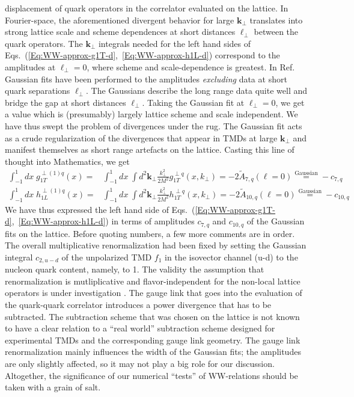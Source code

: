 \documentclass[a4paper,11pt]{article}
\newcommand{\ba}{\begin{eqnarray}}
\newcommand{\ea}{\end{eqnarray}}
\def\bflperp{{\bm \ell}_\perp}
\def\bfkperp{{\bm k}_\perp}
\def\kperp{k_\perp}
\begin{document}
displacement of quark operators in the correlator evaluated on the lattice. 
In Fourier-space, the aforementioned divergent behavior for large $\bfkperp$ 
translates into strong lattice scale and scheme dependences at short distances
$\bflperp$ between the quark operators. The $\bfkperp$ integrals needed for 
the left hand sides of Eqs.~(\ref{Eq:WW-approx-g1T-d},~\ref{Eq:WW-approx-h1L-d})
correspond to the amplitudes at $\bflperp = 0$, where scheme and 
scale-dependence is greatest.  In Ref.~\cite{Musch:2010ka} Gaussian fits 
have been performed to the amplitudes \emph{excluding} data at short quark 
separations $\bflperp$. The Gaussians describe the long range data quite well 
and bridge the gap at short distances $\bflperp$. 
Taking the Gaussian fit at $\bflperp = 0$, we get a value which is 
(presumably) largely lattice scheme and scale independent. We have thus 
swept the problem of divergences under the rug. The Gaussian fit acts as 
a crude regularization of the divergences that appear in TMDs at large 
$\bfkperp$ and manifest themselves as short range artefacts on the lattice. 
Casting this line of thought into Mathematics, we get
\ba
    	\int_{-1}^1 d x\; g_{1T}^{\perp(1)q}(x) 
	= & \int_{-1}^1 d x\; \int  d^2 \bfkperp 
	\frac{\kperp^2}{2M^2} g_{1T}^{\perp q}(x,\kperp) 
	= -2 \tilde{A}_{7,q}( \ell = 0 ) 
	\stackrel{\text{Gaussian}}{=} -c_{7,q}\\
    	\int_{-1}^1 d x\; h_{1L}^{\perp(1)q}(x) 
	= & \int_{-1}^1 d x\; \int  d^2 \bfkperp 
	\frac{\kperp^2}{2M^2} h_{1T}^{\perp q}(x,\kperp) 
	= -2 \tilde{A}_{10,q}( \ell = 0 ) 
	\stackrel{\text{Gaussian}}{=} -c_{10,q}
\ea
We have thus expressed the left hand side of 
Eqs.~(\ref{Eq:WW-approx-g1T-d},~\ref{Eq:WW-approx-h1L-d}) in terms of 
amplitudes $c_{7,q}$ and $c_{10,q}$ of the Gaussian fits on the lattice.
Before quoting numbers, a few more comments are in order. The overall 
multiplicative renormalization had been fixed by setting the Gaussian 
integral $c_{2,u-d}$ of the unpolarized TMD $f_1$ in the isovector channel 
(u-d) to the nucleon quark content, namely, to 1. The validity the 
assumption that renormalization is mutliplicative and flavor-independent 
for the non-local lattice operators is under investigation 
\cite{Micheal-new}.
The gauge link that goes into the evaluation of the quark-quark correlator 
introduces a power divergence that has to be subtracted. The subtraction 
scheme that was chosen on the lattice is not known to have a clear relation 
to a ``real world'' subtraction scheme designed for experimental TMDs and 
the corresponding gauge link geometry. The gauge link renormalization mainly 
influences the width of the Gaussian fits; the amplitudes are only slightly 
affected, so it may not play a big role for our discussion. Altogether, the 
significance of our numerical ``tests'' of WW-relations should be taken 
with a grain of salt.
\end{document}
